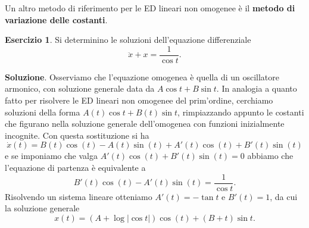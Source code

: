 \documentclass[a4paper,twoside]{article}
\theoremstyle{definition}
\newtheorem{ex}[theorem]{Esercizio}
\numberwithin{theorem}{section}
\begin{document}
Un altro metodo di riferimento per le ED lineari non omogenee è il \textbf{metodo di variazione delle costanti}.

\begin{ex} Si determinino le soluzioni dell'equazione differenziale 
$$ \ddot{x}+x = \frac{1}{\cos t}. $$
\end{ex}
\textbf{Soluzione}. Osserviamo che l'equazione omogenea è quella di un oscillatore armonico, con soluzione generale data da $A\cos t+B\sin t$. In analogia a quanto fatto per risolvere le ED lineari non omogenee del prim'ordine, cerchiamo soluzioni della forma $A(t)\cos t+B(t)\sin t$, rimpiazzando appunto le costanti che figurano nella soluzione generale dell'omogenea con funzioni inizialmente incognite. Con questa sostituzione si ha 
$$ \dot{x}(t) = B(t)\cos(t)-A(t)\sin(t)+A'(t)\cos(t)+B'(t)\sin(t)$$
e se imponiamo che valga $A'(t)\cos(t)+B'(t)\sin(t)=0$ abbiamo che l'equazione di partenza è equivalente a 
$$ B'(t)\cos(t)-A'(t)\sin(t) = \frac{1}{\cos t}.$$
Risolvendo un sistema lineare otteniamo $A'(t)=-\tan t$ e $B'(t)=1$, da cui la soluzione generale 
$$ x(t) = (A+\log|\cos t|)\cos(t) + (B+t)\sin t.$$




\newpage
\end{document}
